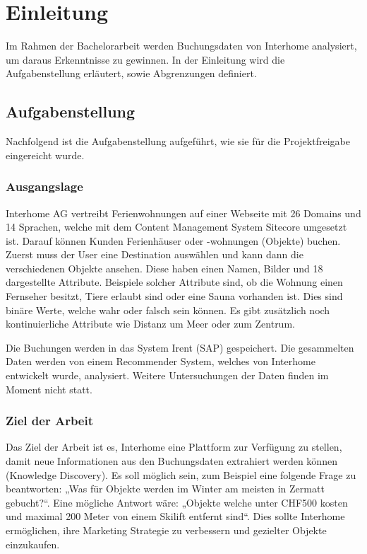 \chapter{Einleitung}
Im Rahmen der Bachelorarbeit werden Buchungsdaten von Interhome analysiert, um daraus Erkenntnisse zu gewinnen. In der Einleitung wird die Aufgabenstellung erläutert, sowie Abgrenzungen definiert.
 
\section{Aufgabenstellung}
Nachfolgend ist die Aufgabenstellung aufgeführt, wie sie für die Projektfreigabe eingereicht wurde.

\subsection{Ausgangslage}
Interhome AG vertreibt Ferienwohnungen auf einer Webseite mit 26 Domains und 14 Sprachen, welche mit dem Content Management System Sitecore umgesetzt ist. Darauf können Kunden Ferienhäuser oder -wohnungen (Objekte) buchen. Zuerst muss der User eine Destination auswählen und kann dann die verschiedenen Objekte ansehen. Diese haben einen Namen, Bilder und 18 dargestellte Attribute. Beispiele solcher Attribute sind, ob die Wohnung einen Fernseher besitzt, Tiere erlaubt sind oder eine Sauna vorhanden ist. Dies sind binäre Werte, welche wahr oder falsch sein können. Es gibt zusätzlich noch kontinuierliche Attribute wie Distanz um Meer oder zum Zentrum.

Die Buchungen werden in das System Irent (SAP) gespeichert. Die gesammelten Daten werden von einem Recommender System, welches von Interhome entwickelt wurde, analysiert. Weitere Untersuchungen der Daten finden im Moment nicht statt.

\subsection{Ziel der Arbeit}
Das Ziel der Arbeit ist es, Interhome eine Plattform zur Verfügung zu stellen, damit neue Informationen aus den Buchungsdaten extrahiert werden können (Knowledge Discovery). Es soll möglich sein, zum Beispiel eine folgende Frage zu beantworten: „Was für Objekte werden im Winter am meisten in Zermatt gebucht?“. Eine mögliche Antwort wäre: „Objekte welche unter CHF500 kosten und maximal 200 Meter von einem Skilift entfernt sind“.
Dies sollte Interhome ermöglichen, ihre Marketing Strategie zu verbessern und gezielter Objekte einzukaufen.

